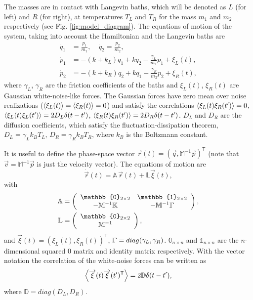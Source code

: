 The  masses are in contact with Langevin baths, which will be denoted as $L$ (for left) and $R$ (for right), at temperatures $T_{L}$ and $T_R$ for  the mass $m_1$ and $m_2$ respectively (see Fig. \ref{fig:model_diagram}). The equations of motion of the system, taking into account the Hamiltonian and the Langevin baths are
%
\begin{align}
  \dot{q}_1 &= \frac{p_1}{m_1},\;\;\;\;
  \dot{q}_2 = \frac{p_2}{m_2},\nonumber
  \\
  \dot{p}_1 &= -(k+k_L)q_1 + k q_2 -\frac{\gamma_L}{m_1} p_1 + \xi_L(t),\nonumber
  \\
  \dot{p}_2 &= -(k+k_R)q_2 + k q_1 -\frac{\gamma_R}{m_2} p_2 + \xi_R(t),
\end{align}
%
where $\gamma_L$, $\gamma_R$ are the friction coefficients of the baths and $\xi_L(t)$, $\xi_R(t)$ are Gaussian white-noise-like forces. The Gaussian forces have zero mean over noise realizations ($\expval{ \xi_L(t) } = \expval{ \xi_R(t) } = 0 $) and satisfy the correlations $\expval{ \xi_L(t)\xi_R(t') } = 0$, $\expval{ \xi_L(t)\xi_L(t') } = 2D_L\delta(t-t')$, $\expval{ \xi_R(t)\xi_R(t') } = 2D_R\delta(t-t')$. $D_L$ and $D_R$ are the diffusion coefficients, which satisfy the fluctuation-dissipation theorem, $D_L = \gamma_L k_B T_L$, $D_R =\gamma_R k_B T_R$, where  $k_B$ is the Boltzmann constant.

It is useful to define the phase-space vector $\overrightarrow{r}(t) = \left( \overrightarrow{q}, \mathbb{M}^{-1}\overrightarrow{p} \right)^\mathsf{T}$ (note that $\overrightarrow{v} = \mathbb{M}^{-1}\overrightarrow{p}$ is just the velocity vector).  The equations of motion are
%
\begin{equation}
  \dot{\overrightarrow{r}}(t) = \mathbb{A} \, \overrightarrow{r}(t) + \mathbb{L}\overrightarrow{\xi}(t),
  \label{eq:chapter6_vectorEqOfMotion}
\end{equation}
%
with
%
\begin{align}
  \mathbb{A} &=
  \left(
  \begin{array}{cc}
    \mathbb{0}_{2 \times 2} & \mathbb{1}_{2 \times 2}
    \\
    -\mathbb{M}^{-1}\mathbb{K} & -\mathbb{M}^{-1}\bbGamma
  \end{array}
  \right),
  \nonumber
  \\
  \mathbb{L} &=
  \left(
  \begin{array}{c}
    \mathbb{0}_{2\times 2} \\ \mathbb{M}^{-1}
  \end{array}
  \right),
  \label{eq:chapter6_Dynamical_Matrix}
\end{align}
%
and $\overrightarrow{\xi}(t) = \left( \xi_L(t),\xi_R(t) \right)^\mathsf{T}$, $\bbGamma = diag(\gamma_L,\gamma_R)$. $\mathbb{0}_{n\times n}$ and $\mathbb{1}_{n\times n}$ are the $n$-dimensional squared 0 matrix and identity matrix respectively. With the vector notation the correlation of the white-noise forces can be written as
%
\begin{equation}
  \expval{\overrightarrow{\xi}(t)\overrightarrow{\xi}(t')^\mathsf{T}} = 2 \mathbb{D}\delta(t-t'),
\end{equation}
%
where $\mathbb{D} = diag(D_L,D_R)$.
%
%
%
%
%
%
